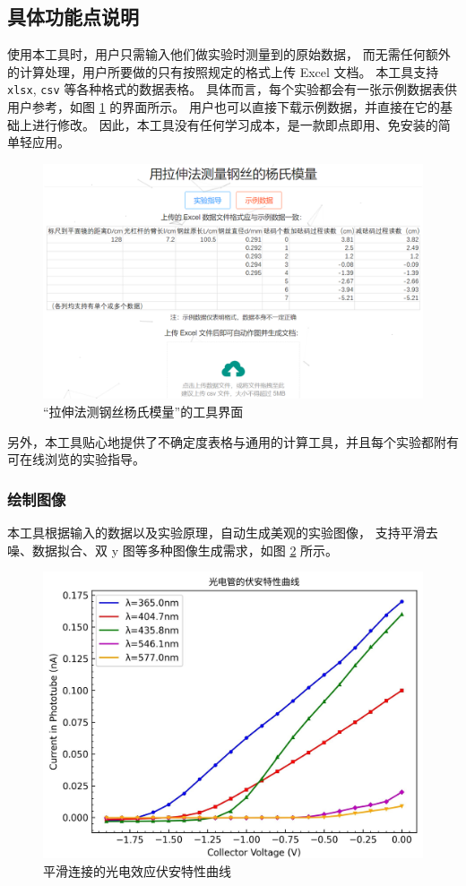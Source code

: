 \subsection{具体功能点说明}

使用本工具时，用户只需输入他们做实验时测量到的原始数据，
而无需任何额外的计算处理，用户所要做的只有按照规定的格式上传 Excel 文档。
本工具支持 \verb|xlsx|, \verb|csv| 等各种格式的数据表格。
具体而言，每个实验都会有一张示例数据表供用户参考，如图 \ref{fig:interface} 的界面所示。
用户也可以直接下载示例数据，并直接在它的基础上进行修改。
因此，本工具没有任何学习成本，是一款即点即用、免安装的简单轻应用。

\begin{figure}[p]
  \centering
  \includegraphics[width=0.67\columnwidth]{figure/interface.png}
  \caption{“拉伸法测钢丝杨氏模量”的工具界面}
  \label{fig:interface}
\end{figure}

另外，本工具贴心地提供了不确定度表格与通用的计算工具，并且每个实验都附有可在线浏览的实验指导。

\subsubsection*{绘制图像}

本工具根据输入的数据以及实验原理，自动生成美观的实验图像，
支持平滑去噪、数据拟合、双 y 图等多种图像生成需求，如图 \ref{fig:draw} 所示。

\begin{figure}[p]
  \centering
  \includegraphics[width=0.67\columnwidth]{figure/draw.jpg}
  \caption{平滑连接的光电效应伏安特性曲线}
  \label{fig:draw}
\end{figure}

